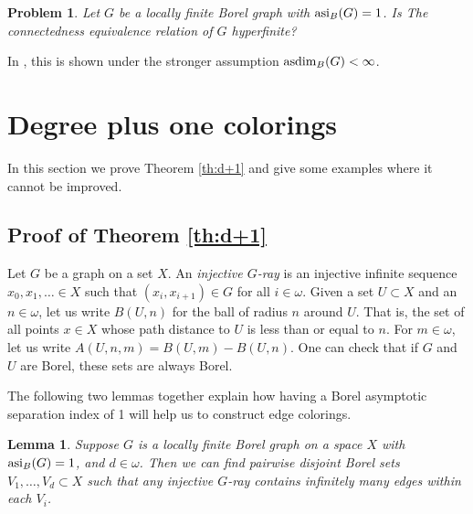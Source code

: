\documentclass[10pt,a4paper]{article}
\newcommand{\0}{\varnothing}
\newcommand{\asdim}{\textnormal{asdim}}
\newcommand{\asi}{\textnormal{asi}}
\newtheorem{lemma}{Lemma}
\newtheorem{prob}{Problem}
\begin{document}
\begin{prob}\label{prob:hyperfinite}
Let $G$ be a locally finite Borel graph with $\asi_B(G) = 1$. Is The connectedness equivalence relation of $G$ hyperfinite?
\end{prob}

In \cite{dim}, this is shown under the stronger assumption $\asdim_B(G) < \infty$.


\section{Degree plus one colorings}\label{sec:d+1}


In this section we prove Theorem \ref{th:d+1} and give some examples where it cannot be improved. 

\subsection{Proof of Theorem \ref{th:d+1}}

Let $G$ be a graph on a set $X$. An \textit{injective $G$-ray} is an injective infinite sequence $x_0,x_1,\ldots \in X$ such that $(x_i,x_{i+1}) \in G$ for all $i \in \omega$. Given a set $U \subset X$ and an $n \in \omega$, let us write $B(U,n)$ for the ball of radius $n$ around $U$. That is, the set of all points $x \in X$ whose path distance to $U$ is less than or equal to $n$. For $m \in \omega$, let us write $A(U,n,m) = B(U,m)-B(U,n)$. One can check that if $G$ and $U$ are Borel, these sets are always Borel.

The following two lemmas together explain how having a Borel asymptotic separation index of 1 will help us to construct edge colorings.

\begin{lemma}\label{lem:rainbow}
Suppose $G$ is a locally finite Borel graph on a space $X$ with $\asi_B(G) = 1$, and $d \in \omega$. Then we can find pairwise disjoint Borel sets $V_1,\ldots,V_d \subset X$ such that any injective $G$-ray contains infinitely many edges within each $V_i$.
\end{lemma}
\end{document}
